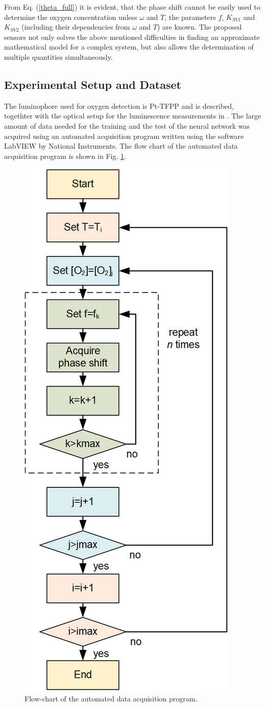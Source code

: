 \documentclass[sensors,article,submit,moreauthors,pdftex,10pt,a4paper]{Definitions/mdpi}
\begin{document}
From Eq. (\ref{theta_full}) it is evident, that the phase shift cannot be easily used to determine the oxygen concentration unless $\omega$ and $T$, the parameters $f$, $K_{SV1}$ and $K_{SV2}$ (including their dependencies from $\omega$ and $T$) are known.
The proposed sensors not only solves the above mentioned difficulties in finding an approximate mathematical model for a complex system, but also allows the determination of multiple quantities simultaneously.

\subsection{Experimental Setup and Dataset}
\label{Experimental}

The luminophore used for oxygen detection is Pt-TFPP and is described, togethter with the optical setup for the luminescence measurements in \cite{Venturini_2020}. 
The large amount of data needed for the training and the test of the neural network was acquired using an automated acquisition program written using the software LabVIEW by National Instruments. The flow chart of the automated data acquisition program is shown in Fig. \ref{fig:auto-data}.

\begin{figure}[t!]
\centering
\includegraphics[keepaspectratio, width=5.8 cm]{flow-chart.png}
\caption{Flow-chart of the automated data acquisition program.}
\label{fig:auto-data}
\end{figure}
\end{document}
